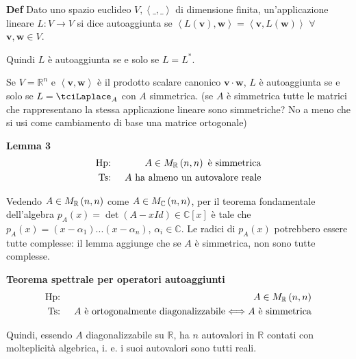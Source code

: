 \documentclass{article}
\begin{document}
\textbf{Def} Dato uno spazio euclideo $V,\left\langle \_,\_\right\rangle $
di dimensione finita, un'applicazione lineare $L:V\rightarrow V$ si dice
autoaggiunta se $\left\langle L\left( \mathbf{v}\right) \mathbf{,w}%
\right\rangle =\left\langle \mathbf{v},L\left( \mathbf{w}\right)
\right\rangle $ $\forall $ $\mathbf{v,w}\in V$.

Quindi $L$ \`{e} autoaggiunta se e solo se $L=L^{\ast }$.

Se $V=%
\mathbb{R}
^{n}$ e $\left\langle \mathbf{v,w}\right\rangle $ \`{e} il prodotto scalare
canonico $\mathbf{v\cdot w}$, $L$ \`{e} autoaggiunta se e solo se $%
L=\tciLaplace _{A}$ con $A$ simmetrica. (se $A$ \`{e} simmetrica tutte le
matrici che rappresentano la stessa applicazione lineare sono simmetriche?
No a meno che si usi come cambiamento di base una matrice ortogonale)

\textbf{Lemma 3}%
\begin{eqnarray*}
\text{Hp} &\text{: }&A\in M_{%
\mathbb{R}
}\left( n,n\right) \text{ \`{e} simmetrica} \\
\text{Ts} &\text{: }&A\text{ ha almeno un autovalore reale}
\end{eqnarray*}

Vedendo $A\in M_{%
\mathbb{R}
}\left( n,n\right) $ come $A\in M_{%
\mathbb{C}
}\left( n,n\right) $, per il teorema fondamentale dell'algebra $p_{A}\left(
x\right) =\det \left( A-xId\right) \in 
\mathbb{C}
\left[ x\right] $ \`{e} tale che $p_{A}\left( x\right) =\left( x-\alpha
_{1}\right) ...\left( x-\alpha _{n}\right) $, $\alpha _{i}\in 
\mathbb{C}
$. Le radici di $p_{A}\left( x\right) $ potrebbero essere tutte complesse:
il lemma aggiunge che se $A$ \`{e} simmetrica, non sono tutte complesse.

\textbf{Teorema spettrale per operatori autoaggiunti}%
\begin{eqnarray*}
\text{Hp}\text{: } &&A\in M_{%
\mathbb{R}
}\left( n,n\right) \\
\text{Ts}\text{: } &&A\text{ \`{e} ortogonalmente diagonalizzabile}%
\Longleftrightarrow A\text{ \`{e} simmetrica}
\end{eqnarray*}

Quindi, essendo $A$ diagonalizzabile su $%
\mathbb{R}
$, ha $n$ autovalori in $%
\mathbb{R}
$ contati con molteplicit\`{a} algebrica, i. e. i suoi autovalori sono tutti
reali.
\end{document}
